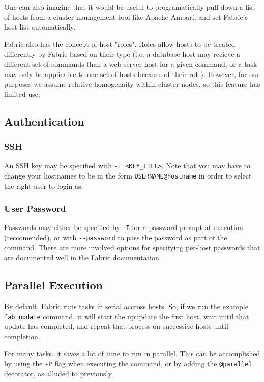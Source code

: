 \documentclass[9pt,twocolumn,twoside]{idsi}
\begin{document}
One can also imagine that it would be useful to programatically pull down a list of hosts from a cluster management tool like Apache Ambari, and set Fabric's host list automatically.

Fabric also has the concept of host "roles". Roles allow hosts to be treated differently by Fabric based on their type (i.e. a database host may recieve a different set of commands than a web server host for a given command, or a task may only be applicable to one set of hosts because of their role). However, for our purposes we assume relative homogenaity within cluster nodes, so this feature has limited use.

\subsection{Authentication}
\subsubsection{SSH}
An SSH key may be specified with \texttt{-i <KEY\_FILE>}. Note that you may have to change your hostnames to be in the form \texttt{USERNAME@hostname} in order to select the right user to login as.

\subsubsection{User Password}
Passwords may either be specified by \texttt{-I} for a password prompt at execution (reccomended), or with \texttt{-\--password} to pass the password as part of the command. There are more involved options for specifying per-host passwords that are documented well in the Fabric documentation.

\subsection{Parallel Execution}
By default, Fabric runs tasks in serial accross hosts. So, if we run the example \texttt{fab update} command, it will start the upupdate the first host, wait until that update has completed, and repeat that process on successive hosts until completion.

For many tasks, it saves a lot of time to run in parallel. This can be accomplished by using the \texttt{-P} flag when executing the command, or by adding the \texttt{@parallel} decorator, as alluded to previously.
\end{document}
